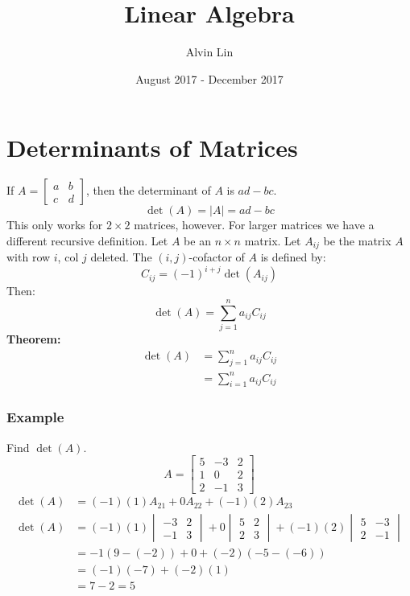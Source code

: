 \documentclass{math}
\title{Linear Algebra}
\author{Alvin Lin}
\date{August 2017 - December 2017}
\begin{document}
\maketitle

\section*{Determinants of Matrices}
If \( A = \begin{bmatrix}a & b \\ c & d\end{bmatrix} \), then the determinant
of \( A \) is \( ad-bc \).
\[ \det(A) = |A| = ad-bc \]
This only works for \( 2\times2 \) matrices, however. For larger matrices we
have a different recursive definition. Let \( A \) be an \( n\times n \)
matrix. Let \( A_{ij} \) be the matrix \( A \) with row \( i \), col \( j \)
deleted. The \( (i,j) \)-cofactor of \( A \) is defined by:
\[ C_{ij} = (-1)^{i+j}\det(A_{ij}) \]
Then:
\[ \det(A) = \sum_{j=1}^{n}a_{ij}C_{ij} \]
\textbf{Theorem:}
\begin{align*}
  \det(A) &= \sum_{j=1}^{n}a_{ij}C_{ij} \\
  &= \sum_{i=1}^{n}a_{ij}C_{ij}
\end{align*}

\subsubsection*{Example}
Find \( \det(A) \).
\[ A = \begin{bmatrix}5 & -3 & 2 \\ 1 & 0 & 2 \\ 2 & -1 & 3\end{bmatrix} \]
\begin{align*}
  \det(A) &= (-1)(1)A_{21}+0A_{22}+(-1)(2)A_{23} \\
  \det(A) &= (-1)(1)\begin{vmatrix}-3 & 2 \\ -1 & 3\end{vmatrix}+
    0\begin{vmatrix}5 & 2 \\ 2 & 3\end{vmatrix}+
    (-1)(2)\begin{vmatrix}5 & -3 \\ 2 & -1\end{vmatrix} \\
  &= -1(9-(-2))+0+(-2)(-5-(-6)) \\
  &= (-1)(-7)+(-2)(1) \\
  &= 7-2 = 5
\end{align*}
\end{document}
